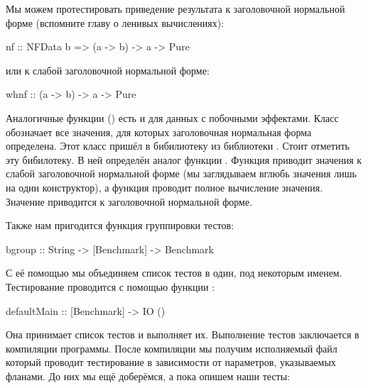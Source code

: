 Мы можем протестировать приведение результата к
заголовочной нормальной форме (вспомните главу о ленивых вычислениях):

\begin{code}
nf :: NFData b => (a -> b) -> a -> Pure
\end{code}

или к слабой заголовочной нормальной форме:

\begin{code}
whnf :: (a -> b) -> a -> Pure
\end{code}

Аналогичные функции () есть и для данных с 
побочными эффектами. Класс  обозначает все 
значения, для которых заголовочная нормальная форма определена.
Этот класс пришёл в бибилиотеку  из
библиотеки . Стоит отметить эту бибилотеку.
В ней определён аналог функции . Функция 
приводит значения к слабой заголовочной нормальной форме 
(мы заглядываем вглюбь значения лишь на один конструктор),
а функция  проводит полное вычисление значения.
Значение приводится к заголовочной нормальной форме.

Также нам пригодится функция группировки тестов:

\begin{code}
bgroup :: String -> [Benchmark] -> Benchmark
\end{code}

С её помощью мы объединяем список тестов в один, 
под некоторым именем. Тестирование проводится
с помощью функции :

\begin{code}
defaultMain :: [Benchmark] -> IO ()
\end{code}

Она принимает список тестов и выполняет их. 
Выполнение тестов заключается в компиляции программы.
После компиляции мы получим исполняемый файл 
который проводит тестирование в зависимости от
параметров, указываемых фланами. До них мы ещё доберёмся,
а пока опишем наши тесты:


